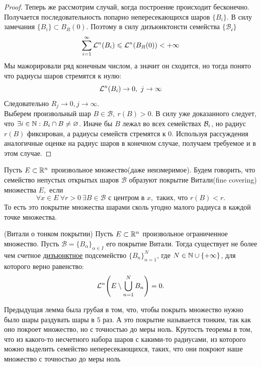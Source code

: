 \begin{proof}
    Теперь же рассмотрим случай, когда построение происходит бесконечно. Получается последовательность попарно непересекающихся шаров $\{B_i\}.$ В силу замечания $\{B_i\} \subset B_{R}(0)$. Поэтому в силу дизъюнктонсти семейства $\{\mathcal{B_i}\}$
    $$\sum_{i = 1}^{\infty} \mathcal{L}^n(B_i) \leqslant \mathcal{L}^n(B_{R}(0)) < +\infty$$
    Мы мажорировали ряд конечным числом, а значит он сходится, но тогда понято что радиусы шаров стремятся к нулю:
    $$\mathcal{L}^n(B_i) \rightarrow 0, \ j \rightarrow \infty$$
    Следовательно $R_j \rightarrow 0, j\rightarrow \infty$. \\
    Выберем произвольный шар $B \in \mathcal{B}, \ r(B) > 0.$ В силу уже доказанного следует, что $\exists i \in \mathbb{N} : B_i \cap B \neq \varnothing$. Иначе бы $B$ лежал во всех семействах  $\mathcal{B}_i$, но радиус $r(B)$ фиксирован, а радиусы семейств стремятся к $0$. Используя рассуждения аналогичные оценке на радиус шаров в конечном случае, получаем требуемое и в этом случае.
\end{proof}

\begin{definition}
    Пусть $E \subset \mathbb{R}^n$ произвольное множество(даже неизмеримое). Будем говорить, что семейство непустых открытых шаров $\mathcal{B}$ образуют покрытие Витали(fine covering) множества $E,$ если 
    $$\forall x \in E \ \forall r > 0 \ \exists B \in \mathcal{B} \text{ с центром в } x, \text{ таких, что } r(B) < r.$$
    То есть это покрытие множества шарами сколь угодно малого радиуса в каждой точке множества.
\end{definition}

\begin{theorem}
    (Витали о тонком покрытии) Пусть $E \subset \mathbb{R}^n$ произвольное ограниченное множество. Пусть $\mathcal{B} = \{B_{\alpha}\}_{\alpha \in I}$ его покрытие Витали. Тогда существует не более чем счетное \underline{дизъюнктное} подсемейство $\{B_n\}_{n = 1}^N$, где $N \in \mathbb{N} \cup \{+\infty\}$, для которого верно равенство:
    $$\mathcal{L}^n\Bigg(E \setminus \bigcup_{n = 1}^{N} B_n \Bigg) = 0.$$
\end{theorem}
\remark Предыдущая лемма была грубая в том, что, чтобы покрыть множество нужно было шары раздувать шары в $5$ раз. А это покрытие называется тонким, так как оно покроет множество, но с точностью до меры ноль. Крутость теоремы в том, что из какого-то несчетного набора шаров с какими-то радиусами, из которого можно выделить семейство непересекающихся, таких, что они покроют наше множество с точностью до меры ноль

